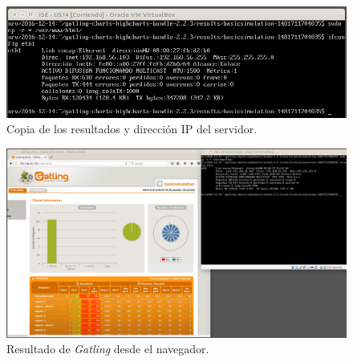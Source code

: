 \documentclass[a4paper,titlepage,12pt]{scrartcl}	%
\numberwithin{figure}{section} %
\numberwithin{table}{section} %
\begin{document}
	\begin{figure}[H]
		\includegraphics[width=\linewidth]{./Imagenes/O1-3.png}
		\vspace{-0.5cm}
		\caption[Copia de los resultados y dirección IP del servidor.]{Copia de los resultados y dirección IP del servidor.}
		\label{O1-3}
	\end{figure}
	
	\begin{figure}[H]
		\includegraphics[width=\linewidth]{./Imagenes/O1-4.png}
		\vspace{-0.5cm}
		\caption[Resultado de \textit{Gatling} desde el navegador.]{Resultado de \textit{Gatling} desde el navegador.}
		\label{O1-4}
	\end{figure}
	
	\clearpage
	
	
\end{document}
